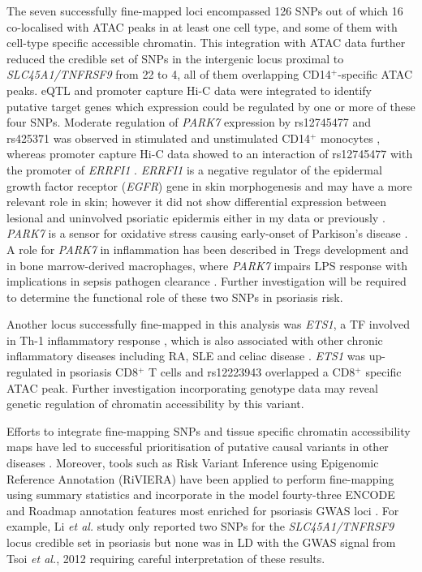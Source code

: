 The seven successfully fine-mapped loci encompassed 126 SNPs out of which 16 co-localised with ATAC peaks in at least one cell type, and some of them with cell-type specific accessible chromatin. This integration with ATAC data further reduced the credible set of SNPs in the intergenic locus proximal to \textit{SLC45A1/TNFRSF9} from 22 to 4, all of them overlapping CD14$^+$-specific ATAC peaks. eQTL and promoter capture Hi-C data were integrated to identify putative target genes which expression could be regulated by one or more of these four SNPs. Moderate regulation of \textit{PARK7} expression by rs12745477 and rs425371 was observed in stimulated and unstimulated CD14$^+$ monocytes \parencite{Fairfax2014}, whereas promoter capture Hi-C data showed to an interaction of rs12745477 with the promoter of \textit{ERRFI1} \parencite{Javierre2016}. \textit{ERRFI1} is a negative regulator of the epidermal growth factor receptor (\textit{EGFR}) gene in skin morphogenesis \parencite{Ferby2006} and may have a more relevant role in skin; however it did not show differential expression between lesional and uninvolved psoriatic epidermis either in my data or previously \parencite{Tsoi2015,Tervaniemi2016}. \textit{PARK7} is a sensor for oxidative stress causing early-onset of Parkison's disease \parencite{Bonifati2003}. A role for \textit{PARK7} in inflammation has been described in Tregs development and in bone marrow-derived macrophages, where \textit{PARK7} impairs LPS response with implications in sepsis pathogen clearance \parencite{Singh2015,Amatullah2017}.  Further investigation will be required to determine the functional role of these two SNPs in psoriasis risk. 

Another locus successfully fine-mapped in this analysis was \textit{ETS1}, a TF involved in Th-1 inflammatory response \parencite{Grenningloh2005}, which is also associated with other chronic inflammatory diseases including RA, SLE and celiac disease \parencite{Okada2014,Trynka2011,Bentham2015}. \textit{ETS1} was up-regulated in psoriasis CD8$^+$ T cells and rs12223943 overlapped a CD8$^+$ specific ATAC peak. Further investigation incorporating genotype data may reveal genetic regulation of chromatin accessibility by this variant.

Efforts to integrate fine-mapping SNPs and tissue specific chromatin accessibility maps have led to successful prioritisation of putative causal variants in other diseases \parencite{Stefan2014}. Moreover, tools such as Risk Variant Inference using Epigenomic Reference Annotation (RiVIERA) have been applied to perform fine-mapping using summary statistics and incorporate in the model fourty-three ENCODE and Roadmap annotation features most enriched for psoriasis GWAS loci \parencite{Li2016}. For example, Li \textit{et al.} study only reported two SNPs for the \textit{SLC45A1/TNFRSF9} locus credible set in psoriasis but none was in LD with the GWAS signal from Tsoi \textit{et al.}, 2012 requiring careful interpretation of these results. 


